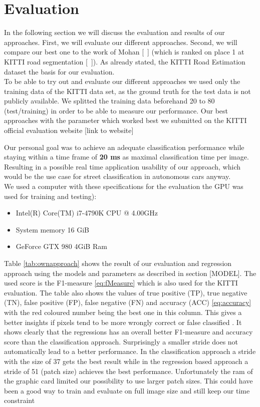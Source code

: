 
\section{Evaluation}\label{sec:evaluation}

In the following section we will discuss the evaluation and results of our approaches. First, we will evaluate our different approaches. Second, we will compare our best one to the work of Mohan [~\cite{Tarel2009}]  (which is ranked on place 1 at KITTI road segmentation [~\cite{Tarel2009}]).
As already stated, the KITTI Road Estimation dataset the basis for our evaluation.\\
To be able to try out and evaluate our different approaches we used only the training data of the KITTI data set, as the ground truth for the test data is not publicly available. We splitted the training data beforehand 20 to 80 (test/training) in order to be able to measure our performance. 
Our best approaches with the parameter which worked best we submitted on the KITTI official evaluation website [link to website]


Our personal goal was to achieve an adequate classification performance while staying within a time frame of \textbf{20 ms} as maximal classification time per image. Resulting in a possible real time application usability of our approach, which would be the use case for street classification in autonomous cars anyway.\\

We used a computer with these specifications for the evaluation the GPU was used for training and testing):
\begin{itemize}
\item Intel(R) Core(TM) i7-4790K CPU @ 4.00GHz
\item System memory 16 GiB
\item GeForce GTX 980 4GiB Ram
\end{itemize}

Table \ref{tab:ownapproach} shows the result of our evaluation and regression approach using the models and parameters as described in section [MODEL]. The used score is the F1-measure \ref{eq:fMeasure} which is also used for the KITTI evaluation.
The table also shows the values of true positive (TP), true negative (TN), false positive (FP), false negative (FN) and accuracy (ACC) \ref{eq:accuracy} with the red coloured number being the best one in this column. This gives a better insights if pixels tend to be more wrongly correct or false classified . It shows clearly that the regressions has an overall better F1-measure and accuracy score than the classification approach. Surprisingly a smaller stride does not automatically lead to a better performance. In the classification approach a stride with the size of 37 gets the best result while in the regression based approach a stride of 51 (patch size) achieves the best performance. Unfortunately the ram of the graphic card limited our possibility to use larger patch sizes. This could have been a good way to train and evaluate on full image size and still keep our time constraint\\

